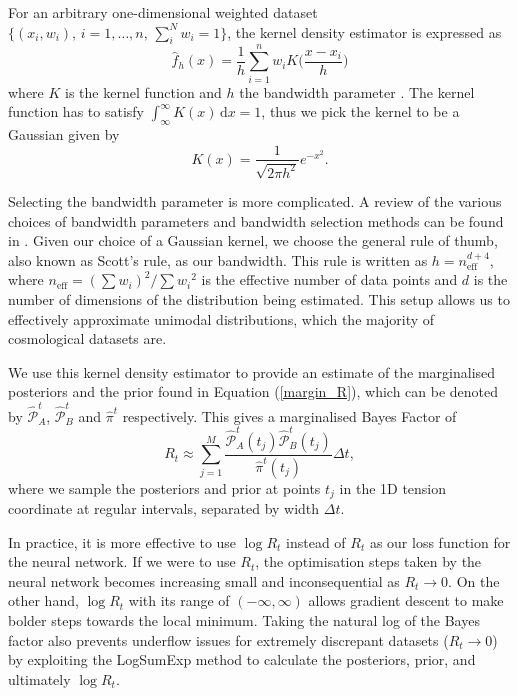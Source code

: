 \documentclass[%
 reprint,
 amsmath,amssymb,
 aps,
]{revtex4-2}
\begin{document}
For an arbitrary one-dimensional weighted dataset $\{(x_{i}, w_{i}), \, i = 1, \dots , n, \, \sum_i^N w_{i} = 1\}$, the kernel density estimator is expressed as
\begin{equation}
    \hat{f}_h (x) = \frac{1}{h} \sum_{i = 1}^{n} w_{i} K \bigg( \frac{x - x_{i}}{h} \bigg)
\end{equation}
where $K$ is the kernel function and $h$ the bandwidth parameter \cite{Rosenblatt1956}. The kernel function has to satisfy $\int_{\infty}^{\infty} K(x) \, \textrm{d} x = 1$, thus we pick the kernel to be a Gaussian given by
\begin{equation}
    K(x) = \frac{1}{\sqrt{2\pi h^2}} e^{-x^2}.
\end{equation}

Selecting the bandwidth parameter is more complicated. A review of the various choices of bandwidth parameters and bandwidth selection methods can be found in \cite{Turlach1993}. Given our choice of a Gaussian kernel, we choose the general rule of thumb, also known as Scott's rule, as our bandwidth. This rule is written as $h = n_{\textrm{eff}}^{d + 4}$, where $n_{\textrm{eff}} = (\sum w_{i})^2 / {\sum {w_{i}}^2}$ is the effective number of data points and $d$ is the number of dimensions of the distribution being estimated. This setup allows us to effectively approximate unimodal distributions, which the majority of cosmological datasets are.

We use this kernel density estimator to provide an estimate of the marginalised posteriors and the prior found in Equation (\ref{margin_R}), which can be denoted by $\hat{\mathcal{P}}_A^{t}$, $\hat{\mathcal{P}}_B^{t}$ and $\hat{\pi}^{t}$ respectively. This gives a marginalised Bayes Factor of
\begin{equation}
    R_t \approx \sum_{j = 1}^{M} \frac{\hat{\mathcal{P}}_A^{t}(t_j) \hat{\mathcal{P}}_B^{t}(t_j)}{\hat{\pi}^{t}(t_j)} \Delta t,
\end{equation}
where we sample the posteriors and prior at points $t_j$ in the 1D tension coordinate at regular intervals, separated by width $\Delta t$.

In practice, it is more effective to use $\log R_t$ instead of $R_t$ as our loss function for the neural network. If we were to use $R_t$, the optimisation steps taken by the neural network becomes increasing small and inconsequential as $R_t \to 0$. On the other hand, $\log R_t$ with its range of $(-\infty, \infty)$ allows gradient descent to make bolder steps towards the local minimum. Taking the natural log of the Bayes factor also prevents underflow issues for extremely discrepant datasets ($R_t \to 0$) by exploiting the LogSumExp method to calculate the posteriors, prior, and ultimately $\log R_t$.
\end{document}
